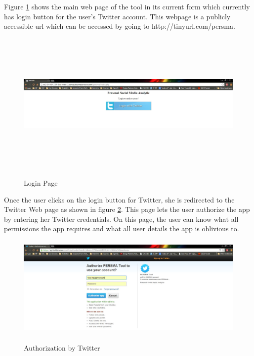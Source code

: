 \documentclass[12pt]{ucthesis}
\newcommand{\captionfonts}{\small\bf\ssp}
\begin{document}
Figure \ref{loginpage} shows the main web page of the tool in its current form which currently has  login button for the user's Twitter account. This webpage is a publicly accessible url which can be accessed by going to http://tinyurl.com/persma.\\
\begin{figure}[!htb]
\begin{center}
\includegraphics[height=70mm, width=.99\linewidth]{loginpage.JPG}
\captionfonts
\caption[Login Page]{Login Page}
\label{loginpage}
\end{center}
\end{figure}%
Once the user clicks on the login button for Twitter, she is redirected to the Twitter Web page as shown in figure \ref{authtwitterpage}. This page lets the user authorize the app by entering her Twitter credentials. On this page, the user can know what all permissions the app requires and what all user details the app is oblivious to.\\
\begin{figure}[!htb]
\begin{center}
\includegraphics[height=50mm, width=.99\linewidth]{twitter_authorize.JPG}
\captionfonts
\caption[Authorization by Twitter]{Authorization by Twitter}
\label{authtwitterpage}
\end{center}
\end{figure}%
\end{document}
